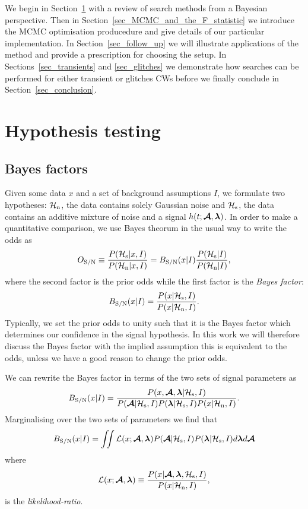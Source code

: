 \documentclass[aps, prd, twocolumn, superscriptaddress, floatfix, showpacs, nofootinbib, longbibliography]{revtex4-1}
\begin{document}
We begin in Section~\ref{sec_hypothesis_testing} with a review of search
methods from a Bayesian perspective. Then in
Section~\ref{sec_MCMC_and_the_F_statistic} we introduce the MCMC optimisation
producedure and give details of our particular implementation. In
Section~\ref{sec_follow_up} we will illustrate applications of the method and
provide a prescription for choosing the setup. In Sections~\ref{sec_transients}
and \ref{sec_glitches} we demonstrate how searches can be performed for either
transient or glitches CWs before we finally conclude in
Section~\ref{sec_conclusion}.

\section{Hypothesis testing}
\label{sec_hypothesis_testing}

\subsection{Bayes factors}
Given some data $x$ and a set of background assumptions $I$, we formulate
two hypotheses: $\mathcal{H}_{\rm n}$, the data contains solely Gaussian noise and $\mathcal{H}_{\rm s}$, the
data contains an additive mixture of noise and a signal $h(t; \boldsymbol{\mathcal{A}}, \boldsymbol{\mathbf{\lambda}})$.
In order to make a quantitative comparison, we use Bayes theorum in the usual
way to write the odds as
\begin{equation}
O_{\rm S/N} \equiv \frac{P(\mathcal{H}_{\rm s}| x, I)}{P(\mathcal{H}_{\rm n}| x, I)} =
B_{\rm S/N}(x| I) \frac{P(\mathcal{H}_{\rm s}| I)}{P(\mathcal{H}_{\rm n} | I)},
\end{equation}
where the second factor is the prior odds while the first factor is the
\emph{Bayes factor}:
\begin{equation}
B_{\rm S/N}(x| I) = \frac{P(x| \mathcal{H}_{\rm s}, I)}{P(x| \mathcal{H}_{\rm n}, I)}.
\end{equation}
Typically, we set the prior odds to unity such that it is the Bayes factor
which determines our confidence in the signal hypothesis. In this work we will
therefore discuss the Bayes factor with the implied assumption this is
equivalent to the odds, unless we have a good reason to change the prior odds.

We can rewrite the Bayes factor in terms of the two sets of signal parameters
as
\begin{equation}
B_{\rm S/N}(x| I) = \frac{P(x, \boldsymbol{\mathcal{A}}, \boldsymbol{\mathbf{\lambda}}|\mathcal{H}_{\rm s}, I)}
{P(\boldsymbol{\mathcal{A}}| \mathcal{H}_{\rm s}, I)P(\boldsymbol{\mathbf{\lambda}}| \mathcal{H}_{\rm s}, I)P(x| \mathcal{H}_{\rm n}, I)}.
\end{equation}
Marginalising over the two sets of parameters we find that
\begin{equation}
B_{\rm S/N}(x| I)= \iint
\mathcal{L}(x; \boldsymbol{\mathcal{A}}, \boldsymbol{\mathbf{\lambda}})
P(\boldsymbol{\mathcal{A}}| \mathcal{H}_{\rm s}, I)P(\boldsymbol{\mathbf{\lambda}}| \mathcal{H}_{\rm s}, I)
d\boldsymbol{\mathbf{\lambda}} d\boldsymbol{\mathcal{A}}
\label{eqn_full_bayes}
\end{equation}
where
\begin{equation}
\mathcal{L}(x; \boldsymbol{\mathcal{A}}, \boldsymbol{\mathbf{\lambda}}) \equiv \frac{P(x |\boldsymbol{\mathcal{A}}, \boldsymbol{\mathbf{\lambda}}, \mathcal{H}_{\rm s}, I)}{P(x| \mathcal{H}_{\rm n}, I)},
\label{eqn_likelihood}
\end{equation}
is the \emph{likelihood-ratio}.
\end{document}
